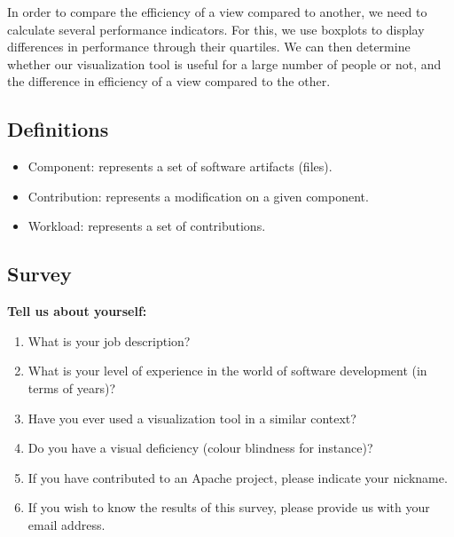 In order to compare the efficiency of a view compared to another, we need to calculate several performance indicators. For this, we use boxplots to display differences in performance through their quartiles. We can then determine whether our visualization tool is useful for a large number of people or not, and the difference in efficiency of a view compared to the other.

\subsection{Definitions}
\begin{itemize}
\item Component: represents a set of software artifacts (files).
\item Contribution: represents a modification on a given component.
\item Workload: represents a set of contributions.
\end{itemize}

\subsection{Survey}

\textbf{Tell us about yourself:}
\begin{enumerate}
\item What is your job description?
\item What is your level of experience in the world of software development (in terms of years)?
\item Have you ever used a visualization tool in a similar context?
\item Do you have a visual deficiency (colour blindness for instance)?
\item If you have contributed to an Apache project, please indicate your nickname.
\item If you wish to know the results of this survey, please provide us with your email address.
\end{enumerate}

